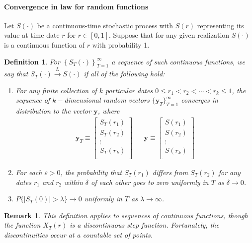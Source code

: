 \documentclass{article}
\newtheorem{remark}{Remark}
\newtheorem{definition}{Definition}
\begin{document}
\paragraph{Convergence in law for random functions}
Let $S(\cdot)$ be a continuous-time stochastic process with $S(r)$ representing its value at time date $r$ for $r\in [0,1]$. Suppose that for any given realization $S(\cdot)$ is a continuous function of $r$ with probability 1. 
\begin{definition}
For $\left\{S_{T}(\cdot)\right\}_{T=1}^{\infty}$ a sequence of such continuous functions, we say that $S_{T}(\cdot)\xrightarrow{L}S(\cdot)$ if all of the following hold:
\begin{enumerate}
\item For any finite collection of $k$ particular dates $0\leq r_{1}<r_{2}<\cdots<r_{k}\leq 1$, the sequence of $k-$dimensional random vectors $\{\bm{y}_{T}\}_{T=1}^{\infty}$ converges in distribution to the vector $\bm{y}$, where 
	\begin{eqnarray*}
	\bm{y}_{T}\equiv\left[\begin{array}{c}
	S_{T}(r_{1})\\
	S_{T}(r_{2})\\
	\vdots\\
	S_{T}(r_{k})\\
	\end{array}\right]
	&&
	\bm{y}\equiv\left[\begin{array}{c}
	S(r_{1})\\
	S(r_{2})\\
	\vdots\\
	S(r_{k})\\
	\end{array}\right]
	\end{eqnarray*}
\item For each $\varepsilon>0$, the probability that $S_{T}(r_{1})$ differs from $S_{T}(r_{2})$ for any dates $r_{1}$ and  $r_{2}$ within $\delta$ of each other goes to zero uniformly in $T$ as $\delta\to 0$.
\item $P\{|S_{T}(0)|>\lambda\}\to 0$ uniformly in $T$ as $\lambda\to\infty$.
\end{enumerate}
\end{definition}
\begin{remark}
This definition applies to sequences of continuous functions, though the function $X_{T}(r)$ is a discontinuous step function. Fortunately, the discontinuities occur at a countable set of points.
\end{remark}
\end{document}

